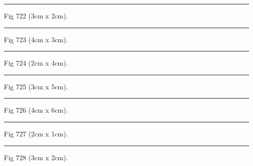 \documentclass[a4paper,11pt]{article}
\begin{document}
\begin{swarmwrap}%
  \begin{minipage}[t]{3cm}
    \centering
    \rule{\linewidth}{2cm}
    {\footnotesize Fig 722 (3cm x 2cm).}
  \end{minipage}%
\end{swarmwrap}%
\swarmwrapnext
\lipsum[122]%

\begin{swarmwrap}%
  \begin{minipage}[t]{4cm}
    \centering
    \rule{\linewidth}{3cm}
    {\footnotesize Fig 723 (4cm x 3cm).}
  \end{minipage}%
\end{swarmwrap}%
\swarmwrapnext
\lipsum[123]%

\begin{swarmwrap}%
  \begin{minipage}[t]{2cm}
    \centering
    \rule{\linewidth}{4cm}
    {\footnotesize Fig 724 (2cm x 4cm).}
  \end{minipage}%
\end{swarmwrap}%
\swarmwrapnext
\lipsum[124]%

\begin{swarmwrap}%
  \begin{minipage}[t]{3cm}
    \centering
    \rule{\linewidth}{5cm}
    {\footnotesize Fig 725 (3cm x 5cm).}
  \end{minipage}%
\end{swarmwrap}%
\swarmwrapnext
\lipsum[125]%

\begin{swarmwrap}%
  \begin{minipage}[t]{4cm}
    \centering
    \rule{\linewidth}{6cm}
    {\footnotesize Fig 726 (4cm x 6cm).}
  \end{minipage}%
\end{swarmwrap}%
\swarmwrapnext
\lipsum[126]%

\begin{swarmwrap}%
  \begin{minipage}[t]{2cm}
    \centering
    \rule{\linewidth}{1cm}
    {\footnotesize Fig 727 (2cm x 1cm).}
  \end{minipage}%
\end{swarmwrap}%
\swarmwrapnext
\lipsum[127]%

\begin{swarmwrap}%
  \begin{minipage}[t]{3cm}
    \centering
    \rule{\linewidth}{2cm}
    {\footnotesize Fig 728 (3cm x 2cm).}
  \end{minipage}%
\end{swarmwrap}%
\swarmwrapnext
\lipsum[128]%
\end{document}

